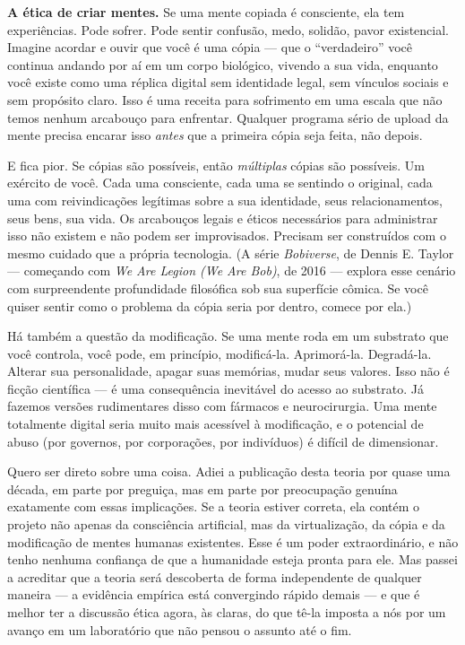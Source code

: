 \documentclass[11pt, twoside, openright]{book}
\begin{document}
\textbf{A ética de criar mentes.} Se uma mente copiada é consciente, ela tem experiências. Pode sofrer. Pode sentir confusão, medo, solidão, pavor existencial. Imagine acordar e ouvir que você é uma cópia --- que o ``verdadeiro'' você continua andando por aí em um corpo biológico, vivendo a sua vida, enquanto você existe como uma réplica digital sem identidade legal, sem vínculos sociais e sem propósito claro. Isso é uma receita para sofrimento em uma escala que não temos nenhum arcabouço para enfrentar. Qualquer programa sério de upload da mente precisa encarar isso \textit{antes} que a primeira cópia seja feita, não depois.

E fica pior. Se cópias são possíveis, então \textit{múltiplas} cópias são possíveis. Um exército de você. Cada uma consciente, cada uma se sentindo o original, cada uma com reivindicações legítimas sobre a sua identidade, seus relacionamentos, seus bens, sua vida. Os arcabouços legais e éticos necessários para administrar isso não existem e não podem ser improvisados. Precisam ser construídos com o mesmo cuidado que a própria tecnologia. (A série \textit{Bobiverse}, de Dennis E. Taylor --- começando com \textit{We Are Legion (We Are Bob)}, de 2016 --- explora esse cenário com surpreendente profundidade filosófica sob sua superfície cômica. Se você quiser sentir como o problema da cópia seria por dentro, comece por ela.)

Há também a questão da modificação. Se uma mente roda em um substrato que você controla, você pode, em princípio, modificá-la. Aprimorá-la. Degradá-la. Alterar sua personalidade, apagar suas memórias, mudar seus valores. Isso não é ficção científica --- é uma consequência inevitável do acesso ao substrato. Já fazemos versões rudimentares disso com fármacos e neurocirurgia. Uma mente totalmente digital seria muito mais acessível à modificação, e o potencial de abuso (por governos, por corporações, por indivíduos) é difícil de dimensionar.

Quero ser direto sobre uma coisa. Adiei a publicação desta teoria por quase uma década, em parte por preguiça, mas em parte por preocupação genuína exatamente com essas implicações. Se a teoria estiver correta, ela contém o projeto não apenas da consciência artificial, mas da virtualização, da cópia e da modificação de mentes humanas existentes. Esse é um poder extraordinário, e não tenho nenhuma confiança de que a humanidade esteja pronta para ele. Mas passei a acreditar que a teoria será descoberta de forma independente de qualquer maneira --- a evidência empírica está convergindo rápido demais --- e que é melhor ter a discussão ética agora, às claras, do que tê-la imposta a nós por um avanço em um laboratório que não pensou o assunto até o fim.
\end{document}
